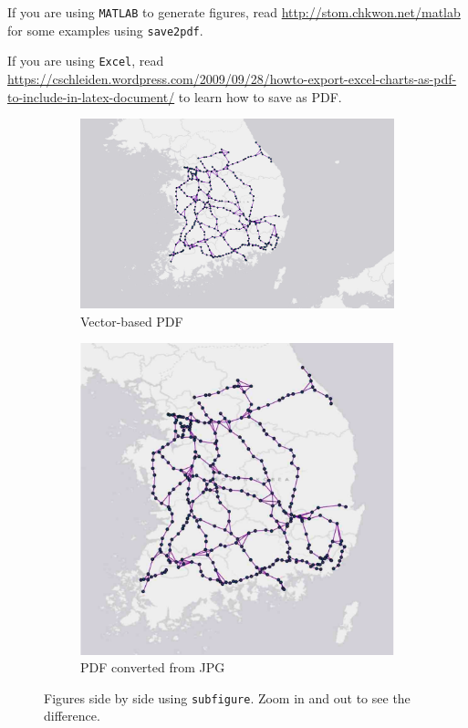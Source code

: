 \documentclass[letterpaper, 11pt]{article}
\begin{document}
If you are using \texttt{MATLAB} to generate figures, read \url{http://stom.chkwon.net/matlab} for some examples using \texttt{save2pdf}.

If you are using \texttt{Excel}, read \url{https://cschleiden.wordpress.com/2009/09/28/howto-export-excel-charts-as-pdf-to-include-in-latex-document/} to learn how to save as PDF.



\begin{figure} \centering
\begin{subfigure}[b]{0.4\textwidth}
\includegraphics[width=\textwidth]{map}
\caption{Vector-based PDF}
\label{fig:map-pdf}
\end{subfigure}
%
\begin{subfigure}[b]{0.4\textwidth}
\includegraphics[width=\textwidth]{map-jpg}
\caption{PDF converted from JPG}
\label{fig:map-jpg}
\end{subfigure}
\caption{Figures side by side using \texttt{subfigure}. Zoom in and out to see the difference.}
\label{fig:side-by-side}
\end{figure}
\end{document}
